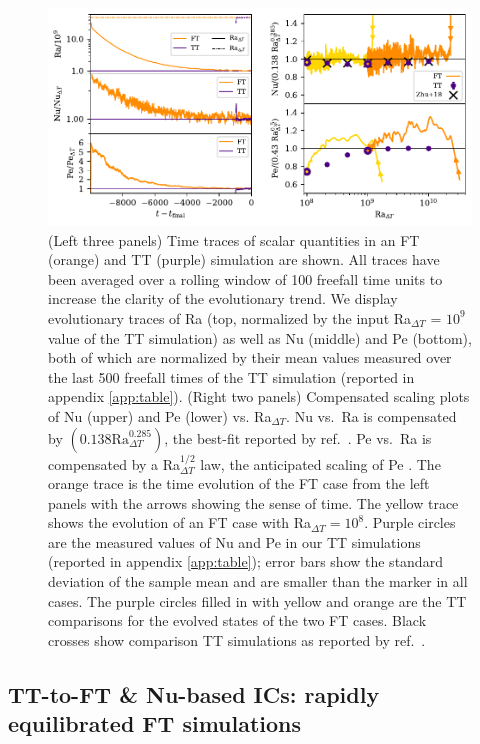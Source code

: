 \documentclass[aps, pre, onecolumn, nofootinbib, notitlepage, groupedaddress, amsfonts, amssymb, amsmath, longbibliography, superscriptaddress]{revtex4-1}
\begin{document}
\begin{figure}[t!]
\includegraphics[width=\textwidth]{./figs/rbc_scalar_comparisons.pdf}
\caption{ 
	(Left three panels) Time traces of scalar quantities in an FT (orange) and TT (purple) simulation are shown.
	All traces have been averaged over a rolling window of 100 freefall time units to increase the clarity of the evolutionary trend.
	We display evolutionary traces of Ra (top, normalized by the input Ra$_{\Delta T}$ = $10^9$ value of the TT simulation) as well as Nu (middle) and Pe (bottom), both of which are normalized by their mean values measured over the last 500 freefall times of the TT simulation (reported in appendix \ref{app:table}).
	(Right two panels) Compensated scaling plots of Nu (upper) and Pe (lower) vs. Ra$_{\Delta T}$.
	Nu vs.~Ra is compensated by $(0.138 \text{Ra}_{\Delta T}^{0.285})$, the best-fit reported by ref.~\cite{johnston&doering2009}.
	Pe vs.~Ra is compensated by a Ra$_{\Delta T}^{1/2}$ law, the anticipated scaling of Pe \cite{ahlers&all2009}.
	The orange trace is the time evolution of the FT case from the left panels with the arrows showing the sense of time.
	The yellow trace shows the evolution of an FT case with Ra$_{\Delta T} = 10^8$.
	Purple circles are the measured values of Nu and Pe in our TT simulations (reported in appendix \ref{app:table}); error bars show the standard deviation of the sample mean and are smaller than the marker in all cases.
	The purple circles filled in with yellow and orange are the TT comparisons for the evolved states of the two FT cases.
	Black crosses show comparison TT simulations as reported by ref.~\cite{zhu&all2018}.
\label{fig:rbc_scalar_comparisons} }
\end{figure}



\subsection{TT-to-FT \& Nu-based ICs: rapidly equilibrated FT simulations}
\label{sec:tt-to-ft}
\end{document}

